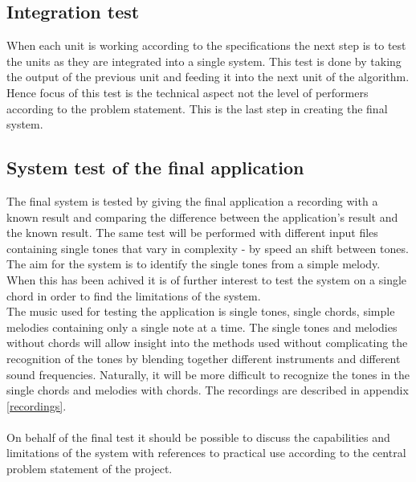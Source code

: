 \subsection{Integration test}
When each unit is working according to the specifications the next step is to test the units as they are integrated into a single system. This test is done by taking the output of the previous unit and feeding it into the next unit of the algorithm. Hence focus of this test is the technical aspect not the level of performers according to the problem statement. This is the last step in creating the final system.

\subsection{System test of the final application}
The final system is tested by giving the final application a recording with a known result and comparing the difference between the application's result and the known result. The same test will be performed with different input files containing single tones that vary in complexity - by speed an shift between tones. The aim for the system is to identify the single tones from a simple melody. \\
When this has been achived it is of further interest to test the system on a single chord in order to find the limitations of the system.
\\
The music used for testing the application is single tones, single chords, simple melodies containing only a single note at a time. The single tones and melodies without chords will allow insight into the methods used without complicating the recognition of the tones by blending together different instruments and different sound frequencies. Naturally, it will be more difficult to recognize the tones in the single chords and melodies with chords. The recordings are described in appendix \ref{recordings}. \\
\\
On behalf of the final test it should be possible to discuss the capabilities and limitations of the system with references to practical use according to the central problem statement of the project.  